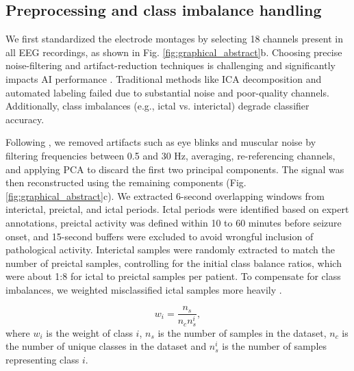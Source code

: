 \documentclass[a4paper,fleqn]{cas-sc}
\begin{document}
\subsection{Preprocessing and class imbalance handling}

We first standardized the electrode montages by selecting 18 channels present in all EEG recordings, as shown in Fig. \ref{fig:graphical_abstract}b. Choosing precise noise-filtering and artifact-reduction techniques is challenging and significantly impacts AI performance \cite{MazurekPreprocessing}. Traditional methods like ICA decomposition and automated labeling \cite{BigdelyPrep_pipeline, LiIcalabel} failed due to substantial noise and poor-quality channels. Additionally, class imbalances (e.g., ictal vs. interictal) degrade classifier accuracy.

Following \cite{MazurekPreprocessing}, we removed artifacts such as eye blinks and muscular noise by filtering frequencies between 0.5 and 30 Hz, averaging, re-referencing channels, and applying PCA to discard the first two principal components. The signal was then reconstructed using the remaining components (Fig. \ref{fig:graphical_abstract}c). We extracted 6-second overlapping windows from interictal, preictal, and ictal periods. Ictal periods were identified based on expert annotations, preictal activity was defined within 10 to 60 minutes before seizure onset, and 15-second buffers were excluded to avoid wrongful inclusion of pathological activity. Interictal samples were randomly extracted to match the number of preictal samples, controlling for the initial class balance ratios, which were about 1:8 for ictal to preictal samples per patient. To compensate for class imbalances, we weighted misclassified ictal samples more heavily \cite{king2001regression}. 

\begin{equation}
    w_{i} = \frac{n_{s}}{n_{c}n_{s}^{i}},
\end{equation}
where $w_{i}$ is the weight of class $i$, $n_{s}$ is the number of samples in the dataset, $n_{c}$ is the number of unique classes in the dataset and $n_{s}^{i}$ is the number of samples representing class $i$.
\end{document}
